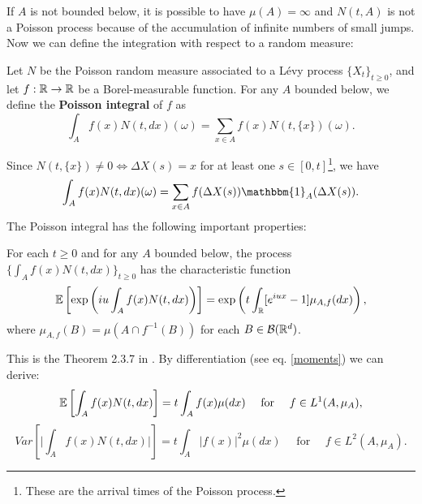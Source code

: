If $A$ is not bounded below, it is possible to have $\mu(A) = \infty$ and $N(t,A)$ is not a Poisson process because of the accumulation of infinite numbers of
small jumps.
\vspace{2em}
Now we can define the integration with respect to a random measure:
\begin{Definition} \label{Poisson_int}
 Let $N$ be the Poisson random measure associated to a Lévy process $\{X_t\}_{t \ge 0}$, and let $f:\mathbb{R} \to \mathbb{R}$ be a Borel-measurable
 function. For any $A$ bounded below, we define the \textbf{Poisson integral} of $f$ as
 \begin{equation}
  \int_A f(x) N(t,dx)(\omega) = \sum_{x\in A} f(x) N(t,\{x\})(\omega). 
 \end{equation}
\end{Definition}
Since $N(t,\{x\}) \neq 0 \Leftrightarrow \Delta X(s)=x$ for at least one $s\in [0,t]$\footnote{These are the arrival 
times of the Poisson process.}, we have  
 \begin{equation}
  \int_A f(x) N(t,dx)(\omega) = \sum_{x\in A} f(\Delta X(s)) \mathbbm{1}_A(\Delta X(s)). 
 \end{equation}
The Poisson integral has the following important properties: 
\begin{Theorem}
 For each $t\geq 0$ and for any $A$ bounded below, the process $\{\int_A f(x) N(t,dx)\}_{t \ge 0}$ has the characteristic function
 \begin{equation}
  \mathbb{E} \left[ \exp \left( i u \int_A f(x) N(t,dx) \right) \right] = 
  \exp \left( t \int_{\mathbb{R}} [e^{iux}-1] \mu_{A,f}(dx) \right),
 \end{equation}
where $\mu_{A,f}(B) = \mu(A \cap f^{-1}(B))$ for each $B \in \mathcal{B}(\mathbb{R}^d)$.
\end{Theorem}
This is the Theorem 2.3.7 in \cite{Applebaum}. By differentiation (see eq. \ref{moments}) we can derive:
\begin{equation}\label{Exp_poiss}
 \mathbb{E} \left[ \int_A f(x) N(t,dx) \right] = t \int_A f(x) \mu(dx) \quad \mbox{ for } \quad f \in L^1(A,\mu_A),
\end{equation}
\begin{equation}
 Var \left[ \biggr|\int_A f(x) N(t,dx)\biggr|\right] = t \int_A |f(x)|^2 \mu(dx) \quad \mbox{ for } \quad f \in L^2(A,\mu_A).
\end{equation}

